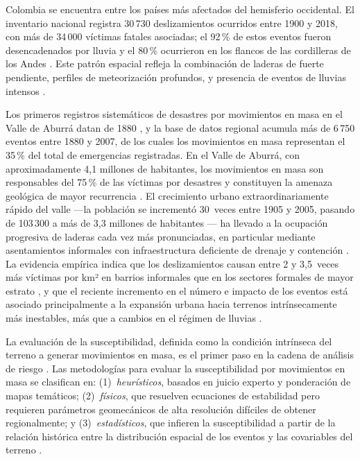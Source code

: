 \documentclass[12pt,a4paper]{article}
\begin{document}
Colombia se encuentra entre los países más afectados del hemisferio
occidental. El inventario nacional registra 30\,730 deslizamientos
ocurridos entre 1900 y 2018, con más de 34\,000 víctimas fatales
asociadas; el 92\,\% de estos eventos fueron desencadenados por lluvia
y el 80\,\% ocurrieron en los flancos de las cordilleras de los Andes
\citep{aristizabal2020landslide}. Este patrón espacial refleja la
combinación de laderas de fuerte pendiente, perfiles de meteorización profundos, y presencia de eventos de lluvias intensos \citep{aristizabal2026landslide}. 

Los primeros
registros sistemáticos de desastres por movimientos en masa en el Valle
de Aburrá datan de 1880 \citep{aristizabal2007inventario}, y la base
de datos regional acumula más de 6\,750 eventos entre 1880 y 2007,
de los cuales los movimientos en masa representan el 35\,\% del total
de emergencias registradas. En el Valle de Aburrá, con
aproximadamente 4{,}1 millones de habitantes, los movimientos en masa
son responsables del 75\,\% de las víctimas por desastres y
constituyen la amenaza geológica de mayor recurrencia
\citep{aristizabal2020landslide, nieto2025coupled}. El crecimiento
urbano extraordinariamente rápido del valle —la población se incrementó
30~veces entre 1905 y 2005, pasando de 103\,300 a más de 3{,}3
millones de habitantes \citep{nieto2025coupled}— ha llevado a la
ocupación progresiva de laderas cada vez más pronunciadas, en particular
mediante asentamientos informales con infraestructura deficiente de
drenaje y contención \citep{nieto2025coupled, aristizabal2026landslide}.
La evidencia empírica indica que los deslizamientos causan entre
2 y 3{,}5~veces más víctimas por km² en barrios informales que en los
sectores formales de mayor estrato \citep{nieto2025coupled}, y que el
reciente incremento en el número e impacto de los eventos está asociado
principalmente a la expansión urbana hacia terrenos intrínsecamente más
inestables, más que a cambios en el régimen de lluvias
\citep{nieto2025coupled, aristizabal2026landslide}.

La evaluación de la susceptibilidad, definida como la condición intrínseca del
terreno a generar movimientos en masa, es el primer paso en la
cadena de análisis de riesgo \citep{hungr2014varnes}. Las metodologías para evaluar la susceptibilidad por movimientos en masa se clasifican en: (1)~\textit{heurísticos}, basados en juicio
experto y ponderación de mapas temáticos; (2)~\textit{físicos}, que
resuelven ecuaciones de estabilidad pero requieren parámetros
geomecánicos de alta resolución difíciles de obtener regionalmente; y
(3)~\textit{estadísticos}, que infieren la susceptibilidad a partir de
la relación histórica entre la distribución espacial de los eventos y
las covariables del terreno \citep{brenning2008statistical}.
\end{document}
